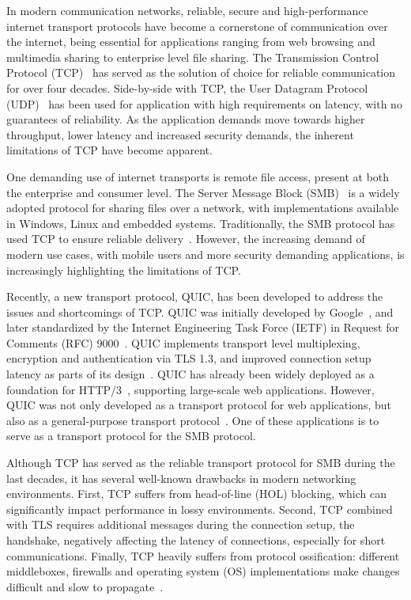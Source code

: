 \documentclass[english, 12pt, a4paper, elec, utf8, a-2b, online]{aaltothesis}
\begin{document}
In modern communication networks, reliable, secure and high-performance internet
transport protocols have become a cornerstone of communication over the internet,
being essential for applications ranging from web browsing and multimedia sharing
to enterprise level file sharing. The Transmission Control Protocol (TCP)~\cite{rfc793}
has served as the solution of choice for reliable communication for over four decades.
Side-by-side with TCP, the User Datagram Protocol (UDP)~\cite{rfc768} has been
used for application with high requirements on latency, with no guarantees of
reliability. As the application demands move towards higher throughput, lower latency
and increased security demands, the inherent limitations of TCP have become apparent.

One demanding use of internet transports is remote file access, present at both
the enterprise and consumer level. The Server Message Block (SMB)~\cite{smb2} is a
widely adopted protocol for sharing files over a network, with implementations available
in Windows, Linux and embedded systems. Traditionally, the SMB protocol has used
TCP to ensure reliable delivery~\cite{smb2}. However, the increasing demand of modern
use cases, with mobile users and more security demanding applications, is increasingly
highlighting the limitations of TCP.

Recently, a new transport protocol, QUIC, has been developed to address
the issues and shortcomings of TCP. QUIC was initially developed by Google~\cite{quic_transport_protocol_design},
and later standardized by the Internet Engineering Task Force (IETF) in Request for Comments (RFC) 9000~\cite{rfc9000}.
QUIC implements transport level multiplexing, encryption and authentication via TLS 1.3, and improved connection
setup latency as parts of its design~\cite{rfc9000,rfc9001}. QUIC has already been
widely deployed as a foundation for HTTP/3~\cite{rfc9114}, supporting large-scale
web applications. However, QUIC was not only developed as a transport protocol for web applications,
but also as a general-purpose transport protocol~\cite{rfc9000}. One of these applications is 
to serve as a transport protocol for the SMB protocol.

Although TCP has served as the reliable transport protocol for SMB during the last
decades, it has several well-known drawbacks in modern networking environments.
First, TCP suffers from head-of-line (HOL) blocking, which can significantly
impact performance in lossy environments. Second, TCP combined with TLS requires
additional messages during the connection setup, the handshake, negatively affecting
the latency of connections, especially for short communications. Finally,
TCP heavily suffers from protocol ossification: different middleboxes, firewalls and
operating system (OS) implementations make changes difficult and slow to propagate~\cite{quic_transport_protocol_design}.
\end{document}
